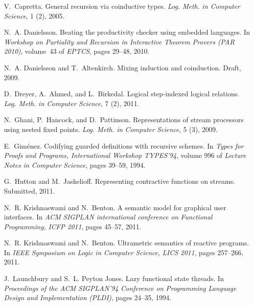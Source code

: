 \documentclass[natbib]{sigplanconf}
\begin{document}
\begin{thebibliography}{24}
V.~Capretta.
\newblock General recursion via coinductive types.
\newblock \emph{Log. Meth. in Computer Science}, 1 (2), 2005.

N.~A. Danielsson.
\newblock Beating the productivity checker using embedded languages.
\newblock In \emph{Workshop on Partiality and Recursion in Interactive Theorem
  Provers (PAR 2010)}, volume~43 of \emph{EPTCS}, pages 29--48, 2010.

N.~A. Danielsson and T.~Altenkirch.
\newblock Mixing induction and coinduction.
\newblock Draft, 2009.

D.~Dreyer, A.~Ahmed, and L.~Birkedal.
\newblock Logical step-indexed logical relations.
\newblock \emph{Log. Meth. in Computer Science}, 7 (2), 2011.

N.~Ghani, P.~Hancock, and D.~Pattinson.
\newblock Representations of stream processors using nested fixed points.
\newblock \emph{Log. Meth. in Computer Science}, 5 (3), 2009.

E.~Gim{\'e}nez.
\newblock Codifying guarded definitions with recursive schemes.
\newblock In \emph{Types for Proofs and Programs, International Workshop
  TYPES'94}, volume 996 of \emph{Lecture Notes in Computer Science}, pages
  39--59, 1994.

G.~Hutton and M.~Jaskelioff.
\newblock Representing contractive functions on streams.
\newblock Submitted, 2011.

N.~R. Krishnaswami and N.~Benton.
\newblock A semantic model for graphical user interfaces.
\newblock In \emph{ACM SIGPLAN international conference on Functional
  Programming, ICFP 2011}, pages 45--57, 2011{}.

N.~R. Krishnaswami and N.~Benton.
\newblock Ultrametric semantics of reactive programs.
\newblock In \emph{IEEE Symposium on Logic in Computer Science, LICS 2011},
  pages 257--266, 2011{}.

J.~Launchbury and S.~L. {Peyton Jones}.
\newblock Lazy functional state threads.
\newblock In \emph{Proceedings of the ACM SIGPLAN'94 Conference on Programming
  Language Design and Implementation (PLDI)}, pages 24--35, 1994.


\end{thebibliography}
\end{document}
